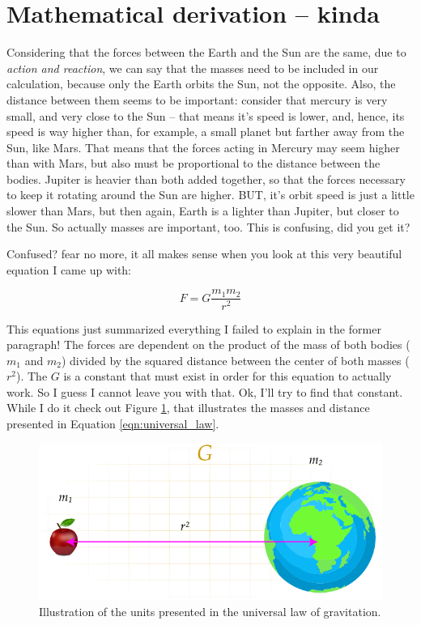 \documentclass[preprint,12pt]{elsarticle}
\begin{document}
\section{Mathematical derivation -- kinda}\label{s:derivation}

Considering that the forces between the Earth and the Sun are the same, due to \emph{action and reaction}, we can say that the masses need to be included in our calculation, because only the Earth orbits the Sun, not the opposite. Also, the distance between them seems to be important: consider that mercury is very small, and very close to the Sun -- that means it's speed is lower, and, hence, its speed is way higher than, for example, a small planet but farther away from the Sun, like Mars. That means that the forces acting in Mercury may seem higher than with Mars, but also must be proportional to the distance between the bodies. Jupiter is heavier than both added together, so that the forces necessary to keep it rotating around the Sun are higher. BUT, it's orbit speed is just a little slower than Mars, but then again, Earth is a lighter than Jupiter, but closer to the Sun. So actually masses are important, too. This is confusing, did you get it?

Confused? fear no more, it all makes sense when you look at this very beautiful equation I came up with:

\begin{equation}\label{eqn:universal_law}
    F = G\frac{m_1 m_2}{r^2}
\end{equation}

This equations just summarized everything I failed to explain in the former paragraph! The forces are dependent on the product of the mass of both bodies ($m_1$ and $m_2$) divided by the squared distance between the center of both masses ($r^2$). The $G$ is a constant that must exist in order for this equation to actually work. So I guess I cannot leave you with that. Ok, I'll try to find that constant. While I do it check out Figure \ref{fig:illustration}, that illustrates the masses and distance presented in Equation \ref{eqn:universal_law}.

\begin{figure}
    \centering
    \includegraphics{figures/scheme.pdf}
    \caption{Illustration of the units presented in the universal law of gravitation.}
    \label{fig:illustration}
\end{figure}
\end{document}
